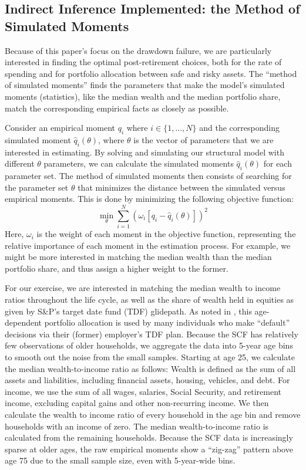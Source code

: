 \documentclass{article}
\begin{document}
\subsection{Indirect Inference Implemented: the Method of Simulated Moments}

Because of this paper's focus on the drawdown failure, we are particularly interested in finding the optimal post-retirement choices, both for the rate of spending and for portfolio allocation between safe and risky assets.
The ``method of simulated moments'' finds the parameters that make the model's simulated moments (statistics), like the median wealth and the median portfolio share, match the corresponding empirical facts as closely as possible.

Consider an empirical moment $q_i$ where $i \in \{1,...,N\}$ and the corresponding simulated moment $\hat{q}_i(\theta)$, where $\theta$ is the vector of parameters that we are interested in estimating.
By solving and simulating our structural model with different $\theta$ parameters, we can calculate the simulated moments $\hat{q}_i(\theta)$ for each parameter set.
The method of simulated moments then consists of searching for the parameter set $\theta$ that minimizes the distance between the simulated versus empirical moments.
This is done by minimizing the following objective function:
\begin{equation}
\min_{\theta} \sum_{i=1}^{N}  \left( \omega_i [q_i - \hat{q}_i(\theta) ] \right)^2
\end{equation}
Here, $\omega_i$ is the weight of each moment in the objective function, representing the relative importance of each moment in the estimation process.
For example, we might be more interested in matching the median wealth than the median portfolio share, and thus assign a higher weight to the former.

For our exercise, we are interested in matching the median wealth to income ratios throughout the life cycle, as well as the share of wealth held in equities as given by S\&P's target date fund (TDF) glidepath.
As noted in \cite{Aboagye2024}, this age-dependent portfolio allocation is used by many individuals who make ``default'' decisions via their (former) employer's TDF plan.
Because the SCF has relatively few observations of older households, we aggregate the data into 5-year age bins to smooth out the noise from the small samples.
Starting at age 25, we calculate the median wealth-to-income ratio as follows: Wealth is defined as the sum of all assets and liabilities, including financial assets, housing, vehicles, and debt.
For income, we use the sum of all wages, salaries, Social Security, and retirement income, excluding capital gains and other non-recurring income.
We then calculate the wealth to income ratio of every household in the age bin and remove households with an income of zero.
The median wealth-to-income ratio is calculated from the remaining households.
Because the SCF data is increasingly sparse at older ages, the raw empirical moments show a ``zig-zag'' pattern above age 75 due to the small sample size, even with 5-year-wide bins.
\end{document}
